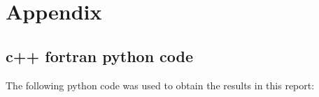 \documentclass[11pt,letterpaper]{article}
\begin{document}
\newpage
\appendix
\section{Appendix}

\subsection{c++ fortran python code}

The following python code was used to obtain the results in this report:








\end{document}
